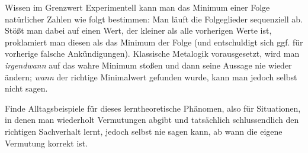 \documentclass{pizzablatt}
\begin{document}
\begin{aufgabe}{Wissen im Grenzwert}
Experimentell kann man das Minimum einer Folge natürlicher Zahlen wie folgt
bestimmen: Man läuft die Folgeglieder sequenziell ab. Stößt man dabei auf einen Wert,
der kleiner als alle vorherigen Werte ist, proklamiert man diesen als das
Minimum der Folge (und entschuldigt sich ggf. für vorherige falsche
Ankündigungen). Klassische Metalogik vorausgesetzt, wird man \emph{irgendwann}
auf das wahre Minimum stoßen und dann seine Aussage nie wieder ändern;
\emph{wann} der richtige Minimalwert gefunden wurde, kann man jedoch selbst
nicht sagen.

Finde Alltagsbeispiele für dieses lerntheoretische Phänomen, also für
Situationen, in denen man wiederholt Vermutungen abgibt und tatsächlich
schlussendlich den richtigen Sachverhalt lernt, jedoch selbst nie sagen kann,
ab wann die eigene Vermutung korrekt ist.
\end{aufgabe}
\end{document}
